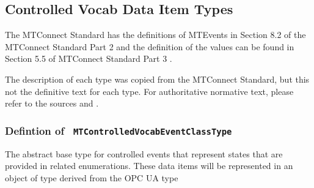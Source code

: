 \FloatBarrier
\subsection{Controlled Vocab Data Item Types} \label{model:ControlledVocabDataItemTypes}

The MTConnect Standard has the definitions of \glspl{MTEvent} in 
Section 8.2 of the MTConnect Standard Part 2 \cite{MTCPart2} and the definition of the 
values can be found in Section 5.5 of MTConnect Standard Part 3 \cite{MTCPart3}. 

The description of each type was copied from the MTConnect Standard,
but this not the definitive text for each type. For authoritative normative text, 
please refer to the sources \cite{MTCPart2} and \cite{MTCPart3}.


\subsubsection{Defintion of \texttt{ MTControlledVocabEventClassType}}
  \label{type:MTControlledVocabEventClassType}

\FloatBarrier

The abstract base type for controlled events that represent states that are provided
in related enumerations. These data items will be represented in an object of
type  derived from the OPC UA type

